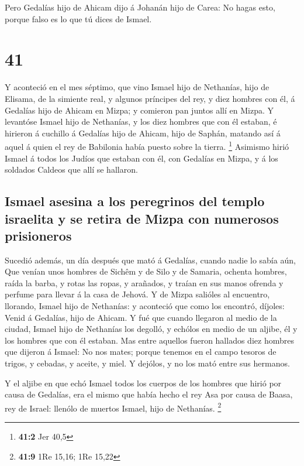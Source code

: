  Pero Gedalías hijo de Ahicam dijo á Johanán hijo de
Carea: No hagas esto, porque falso es lo que tú dices de Ismael.

\hypertarget{section-40}{%
\section{41}\label{section-40}}

 Y aconteció en el mes séptimo, que vino Ismael hijo de
Nethanías, hijo de Elisama, de la simiente real, y algunos príncipes del
rey, y diez hombres con él, á Gedalías hijo de Ahicam en Mizpa; y
comieron pan juntos allí en Mizpa.  Y levantóse Ismael
hijo de Nethanías, y los diez hombres que con él estaban, é hirieron á
cuchillo á Gedalías hijo de Ahicam, hijo de Saphán, matando así á aquel
á quien el rey de Babilonia había puesto sobre la tierra. \footnote{\textbf{41:2}
  Jer 40,5}  Asimismo hirió Ismael á todos los Judíos que
estaban con él, con Gedalías en Mizpa, y á los soldados Caldeos que allí
se hallaron.

\hypertarget{ismael-asesina-a-los-peregrinos-del-templo-israelita-y-se-retira-de-mizpa-con-numerosos-prisioneros}{%
\subsection{Ismael asesina a los peregrinos del templo israelita y se
retira de Mizpa con numerosos
prisioneros}\label{ismael-asesina-a-los-peregrinos-del-templo-israelita-y-se-retira-de-mizpa-con-numerosos-prisioneros}}

 Sucedió además, un día después que mató á Gedalías,
cuando nadie lo sabía aún,  Que venían unos hombres de
Sichêm y de Silo y de Samaria, ochenta hombres, raída la barba, y rotas
las ropas, y arañados, y traían en sus manos ofrenda y perfume para
llevar á la casa de Jehová.  Y de Mizpa salióles al
encuentro, llorando, Ismael hijo de Nethanías: y aconteció que como los
encontró, díjoles: Venid á Gedalías, hijo de Ahicam.  Y
fué que cuando llegaron al medio de la ciudad, Ismael hijo de Nethanías
los degolló, y echólos en medio de un aljibe, él y los hombres que con
él estaban.  Mas entre aquellos fueron hallados diez
hombres que dijeron á Ismael: No nos mates; porque tenemos en el campo
tesoros de trigos, y cebadas, y aceite, y miel. Y dejólos, y no los mató
entre sus hermanos.

 Y el aljibe en que echó Ismael todos los cuerpos de los
hombres que hirió por causa de Gedalías, era el mismo que había hecho el
rey Asa por causa de Baasa, rey de Israel: llenólo de muertos Ismael,
hijo de Nethanías. \footnote{\textbf{41:9} 1Re 15,16; 1Re 15,22}

